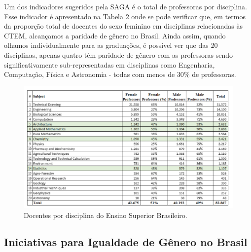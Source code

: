 Um dos indicadores sugeridos pela SAGA é o total de professoras por disciplina. Esse indicador é apresentado na Tabela 2 onde se pode verificar que, em termos da proporção total de docentes do sexo feminino em disciplinas relacionadas às CTEM, alcançamos a paridade de gênero no Brasil. Ainda assim, quando olhamos individualmente para as graduações, é possível ver que das 20 disciplinas, apenas quatro têm paridade de gênero com as professoras sendo significativamente sub-representadas em disciplinas como Engenharia, Computação, Física e Astronomia - todas com menos de 30\% de professoras.

\begin{figure}
    \centering
    \includegraphics[width=.9\textwidth]{chaps/Images/gendertable2.png}
    \caption{Docentes por disciplina do Ensino Superior Brasileiro.}
    \label{fig:gendertable2}
\end{figure}

\subsection{Iniciativas para Igualdade de Gênero no Brasil}

